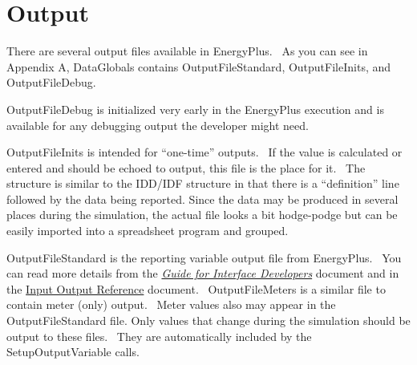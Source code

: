 \chapter{Output}\label{output}

There are several output files available in EnergyPlus.~ As you can see in Appendix A, DataGlobals contains OutputFileStandard, OutputFileInits, and OutputFileDebug.

OutputFileDebug is initialized very early in the EnergyPlus execution and is available for any debugging output the developer might need.

OutputFileInits is intended for ``one-time'' outputs.~ If the value is calculated or entered and should be echoed to output, this file is the place for it.~ The structure is similar to the IDD/IDF structure in that there is a ``definition'' line followed by the data being reported. Since the data may be produced in several places during the simulation, the actual file looks a bit hodge-podge but can be easily imported into a spreadsheet program and grouped.

OutputFileStandard is the reporting variable output file from EnergyPlus.~ You can read more details from the \href{https://energyplus.readthedocs.io/en/latest/guides/interface-developer/index.html}{\emph{Guide for Interface Developers}} document and in the \href{https://energyplus.readthedocs.io/en/latest/guides/input-output-reference/index.html}{Input Output Reference} document.~ OutputFileMeters is a similar file to contain meter (only) output.~ Meter values also may appear in the OutputFileStandard file. Only values that change during the simulation should be output to these files.~ They are automatically included by the SetupOutputVariable calls.

